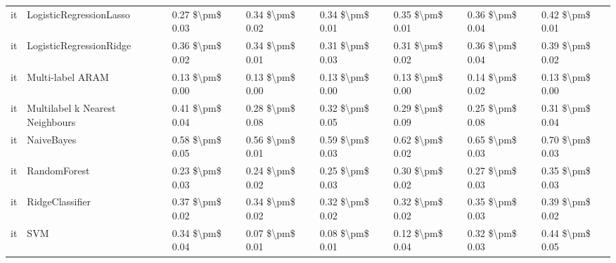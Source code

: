 \begin{tabular}{llllllll}
      it &         LogisticRegressionLasso &     0.27 \$\textbackslash pm\$ 0.03 &           0.34 \$\textbackslash pm\$ 0.02 &       0.34 \$\textbackslash pm\$ 0.01 &        0.35 \$\textbackslash pm\$ 0.01 &                         0.36 \$\textbackslash pm\$ 0.04 &     0.42 \$\textbackslash pm\$ 0.01 \\
      it &         LogisticRegressionRidge &     0.36 \$\textbackslash pm\$ 0.02 &           0.34 \$\textbackslash pm\$ 0.01 &       0.31 \$\textbackslash pm\$ 0.03 &        0.31 \$\textbackslash pm\$ 0.02 &                         0.36 \$\textbackslash pm\$ 0.04 &     0.39 \$\textbackslash pm\$ 0.02 \\
      it &                Multi-label ARAM &     0.13 \$\textbackslash pm\$ 0.00 &           0.13 \$\textbackslash pm\$ 0.00 &       0.13 \$\textbackslash pm\$ 0.00 &        0.13 \$\textbackslash pm\$ 0.00 &                         0.14 \$\textbackslash pm\$ 0.02 &     0.13 \$\textbackslash pm\$ 0.00 \\
      it & Multilabel k Nearest Neighbours &     0.41 \$\textbackslash pm\$ 0.04 &           0.28 \$\textbackslash pm\$ 0.08 &       0.32 \$\textbackslash pm\$ 0.05 &        0.29 \$\textbackslash pm\$ 0.09 &                         0.25 \$\textbackslash pm\$ 0.08 &     0.31 \$\textbackslash pm\$ 0.04 \\
      it &                      NaiveBayes &     0.58 \$\textbackslash pm\$ 0.05 &           0.56 \$\textbackslash pm\$ 0.01 &       0.59 \$\textbackslash pm\$ 0.03 &        0.62 \$\textbackslash pm\$ 0.02 &                         0.65 \$\textbackslash pm\$ 0.03 &     0.70 \$\textbackslash pm\$ 0.03 \\
      it &                    RandomForest &     0.23 \$\textbackslash pm\$ 0.03 &           0.24 \$\textbackslash pm\$ 0.02 &       0.25 \$\textbackslash pm\$ 0.03 &        0.30 \$\textbackslash pm\$ 0.02 &                         0.27 \$\textbackslash pm\$ 0.03 &     0.35 \$\textbackslash pm\$ 0.03 \\
      it &                 RidgeClassifier &     0.37 \$\textbackslash pm\$ 0.02 &           0.34 \$\textbackslash pm\$ 0.02 &       0.32 \$\textbackslash pm\$ 0.02 &        0.32 \$\textbackslash pm\$ 0.02 &                         0.35 \$\textbackslash pm\$ 0.03 &     0.39 \$\textbackslash pm\$ 0.02 \\
      it &                             SVM &     0.34 \$\textbackslash pm\$ 0.04 &           0.07 \$\textbackslash pm\$ 0.01 &       0.08 \$\textbackslash pm\$ 0.01 &        0.12 \$\textbackslash pm\$ 0.04 &                         0.32 \$\textbackslash pm\$ 0.03 &     0.44 \$\textbackslash pm\$ 0.05 \\

\end{tabular}

